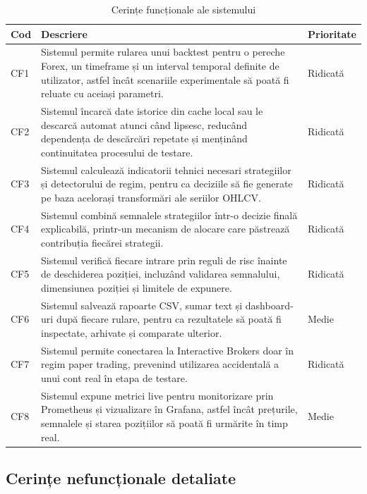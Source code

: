 \begin{longtable}{|p{2cm}|p{9.2cm}|p{3cm}|}
    \caption{Cerințe funcționale ale sistemului}
    \label{tabel:cerinte_functionale}\\
        \hline
        \textbf{Cod} & \textbf{Descriere} & \textbf{Prioritate} \\
        \hline
        CF1 & Sistemul permite rularea unui backtest pentru o pereche Forex, un timeframe și un interval temporal definite de utilizator, astfel încât scenariile experimentale să poată fi reluate cu aceiași parametri. & Ridicată \\
        \hline
        CF2 & Sistemul încarcă date istorice din cache local sau le descarcă automat atunci când lipsesc, reducând dependența de descărcări repetate și menținând continuitatea procesului de testare. & Ridicată \\
        \hline
        CF3 & Sistemul calculează indicatorii tehnici necesari strategiilor și detectorului de regim, pentru ca deciziile să fie generate pe baza acelorași transformări ale seriilor OHLCV. & Ridicată \\
        \hline
        CF4 & Sistemul combină semnalele strategiilor într-o decizie finală explicabilă, printr-un mecanism de alocare care păstrează contribuția fiecărei strategii. & Ridicată \\
        \hline
        CF5 & Sistemul verifică fiecare intrare prin reguli de risc înainte de deschiderea poziției, incluzând validarea semnalului, dimensiunea poziției și limitele de expunere. & Ridicată \\
        \hline
        CF6 & Sistemul salvează rapoarte CSV, sumar text și dashboard-uri după fiecare rulare, pentru ca rezultatele să poată fi inspectate, arhivate și comparate ulterior. & Medie \\
        \hline
        CF7 & Sistemul permite conectarea la Interactive Brokers doar în regim paper trading, prevenind utilizarea accidentală a unui cont real în etapa de testare. & Ridicată \\
        \hline
        CF8 & Sistemul expune metrici live pentru monitorizare prin Prometheus și vizualizare în Grafana, astfel încât prețurile, semnalele și starea pozițiilor să poată fi urmărite în timp real. & Medie \\
        \hline
\end{longtable}

\subsection{Cerințe nefuncționale detaliate}
\label{cap:cap3:cerinte_nefunctionale}

